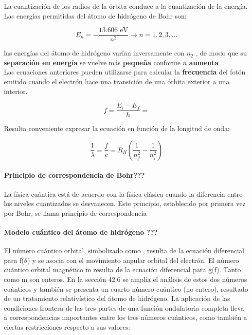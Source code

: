 \documentclass[10pt]{article}
\begin{document}
La cuantización de los radios de la órbita conduce a la cuantización de la energía. Las energías permitidas del
átomo de hidrógeno de Bohr son:

\begin{equation*}
	E_n = - \dfrac{13.606 \text{ eV}}{n^2} \rightarrow n=1,2,3,\dots
\end{equation*}

las energías del átomo de hidrógeno varían inversamente con $n_2$ , de modo que su \textbf{separación en energía} se vuelve más \textbf{pequeña} conforme $n$ \textbf{aumenta}\\
\linebreak
Las ecuaciones anteriores pueden utilizarse para calcular la \textbf{frecuencia} del fotón emitido cuando el electrón hace una transición de una órbita exterior a una interior.

\begin{equation*}
	f = \dfrac{E_i - E_f}{h} = 
\end{equation*}

Resulta conveniente expresar la ecuación en función de la longitud de onda:

\begin{equation*}
	\dfrac{1}{\lambda} = \dfrac{f}{c} = R_H\left( \dfrac{1}{n_f^2} - \dfrac{1}{n_i^2}\right)
\end{equation*}

\paragraph{Principio de correspondencia de Bohr???}
La física cuántica está de acuerdo con la física clásica cuando la diferencia entre los niveles cuantizados se desvanecen. Este principio, establecido por primera vez por Bohr, se llama principio de correspondencia


\paragraph{Modelo cuántico del átomo de hidrógeno ???}

El número cuántico orbital, simbolizado como , resulta de la ecuación diferencial para f($\theta$) y se asocia con el movimiento angular orbital del electrón. El número cuántico orbital magnético m resulta de la ecuación diferencial para g(f). Tanto  como m son enteros. En la sección 42.6 se amplía el análisis de estos dos números cuánticos y también se presenta un cuarto número cuántico (no entero), resultado de un tratamiento relativístico del átomo de hidrógeno. La aplicación de las condiciones frontera de las tres partes de una función ondulatoria completa lleva a correspondencias importantes entre los tres números cuánticos, como también a ciertas restricciones respecto a sus valores:
\end{document}
